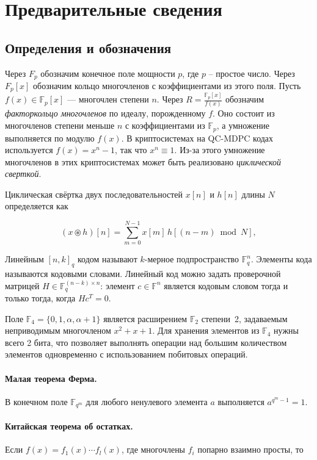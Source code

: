 \documentclass[14pt]{mmcs_article}
\theoremstyle{break}
\begin{document}
\section{Предварительные сведения}
\label{sec2}

\subsection{Определения и обозначения}

Через $F_p$ обозначим конечное поле мощности $p$, где $p$ -- простое число. Через $F_p[x]$ обозначим кольцо многочленов с коэффициентами из этого поля. Пусть $f(x) \in \mathbb{F}_p[x]$ --- многочлен степени $n$. Через $R = \frac{\mathbb{F}_p[x]}{f(x)}$ обозначим \emph{факторкольцо многочленов} по идеалу, порожденному $f$. Оно состоит из многочленов степени меньше $n$ с коэффициентами из $\mathbb{F}_p$, а умножение выполняется по модулю $f(x)$. В криптосистемах на QC-MDPC кодах используется $f(x) = x^n - 1$, так что $x^n \equiv 1$. Из-за этого умножение многочленов в этих криптосистемах может быть реализовано \emph{циклической сверткой}.

Циклическая свёртка двух последовательностей $x[n]$ и $h[n]$ длины $N$ определяется как

\begin{equation}
    (x \circledast h)[n] = \sum_{m=0}^{N-1} x[m]\, h[(n - m) \bmod N],
    \label{eq:cycconv}
\end{equation}

Линейным $[n, k]_q$ кодом называют $k$-мерное подпространство $\mathbb{F}_q^n$. Элементы кода называются кодовыми словами. Линейный код можно задать проверочной матрицей $H \in \mathbb{F}_q^{(n-k)\times n}$: элемент $c \in \mathbb{F}^n$ является кодовым словом тогда и только тогда, когда $H c^T = 0$.

Поле $\mathbb{F}_4 = \{0, 1, \alpha, \alpha+1\}$ является расширением $\mathbb{F}_2$ степени~2, задаваемым неприводимым многочленом $x^2 + x + 1$. Для хранения элементов из $\mathbb{F}_4$ нужны всего 2 бита, что позволяет выполнять операции над большим количеством элементов одновременно с использованием побитовых операций.

\paragraph{Малая теорема Ферма.}
В конечном поле $\mathbb{F}_{q^m}$ для любого ненулевого элемента $a$ выполняется $a^{q^m - 1} = 1$.

\paragraph{Китайская теорема об остатках.}
Если $f(x) = f_1(x) \cdots f_l(x)$, где многочлены $f_i$ попарно взаимно просты, то
\end{document}
